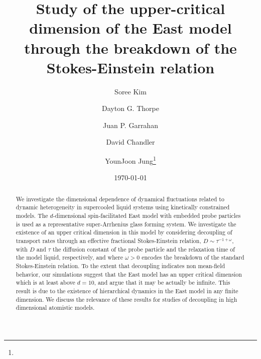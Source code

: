 \documentclass[showpacs,pre,aps,twocolumn,superscriptaddress]{revtex4-1}
\begin{document}
\title{Study of the upper-critical dimension of the East model through the breakdown of the Stokes-Einstein relation}

\author{Soree Kim}

\author{Dayton G. Thorpe}

\author{Juan P. Garrahan}

\author{David Chandler}

\author{YounJoon Jung\thanks{}}%


\date{\today}
             

\begin{abstract}
We investigate the dimensional dependence of 
dynamical fluctuations related to 
dynamic heterogeneity in supercooled liquid systems 
using kinetically constrained models. 
The $d$-dimensional spin-facilitated East model with embedded
probe particles is used as a representative super-Arrhenius glass forming system. 
We investigate the existence of an upper critical dimension in this model
by considering decoupling of transport 
rates through an effective fractional Stokes-Einstein relation, $D\sim{\tau}^{-1+\omega}$, with $D$ and $\tau$ the diffusion constant of the probe particle
and the relaxation time of the model liquid, respectively, and where $\omega > 0$ encodes the breakdown of the standard Stokes-Einstein relation. 
To the extent that decoupling indicates non mean-field behavior, our simulations suggest that the East model has an upper critical dimension which is at least above $d=10$, and argue that it may be actually be infinite. 
This result is due to the existence of hierarchical dynamics in the East model in any finite dimension.  We discuss the relevance of these results for studies of decoupling in high dimensional atomistic models.
\end{abstract}

\maketitle
\end{document}
